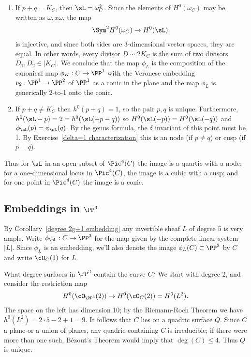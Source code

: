 \begin{enumerate}
\item If $p+q =  K_C$, then $\sL = \omega_C^2$. Since
the elements of $H^0(\omega_C)$ may be written as $\omega, x\omega$, the map
$$
\Sym^2 H^0(\omega_C) \to H^0(\sL).
$$
 is injective, and since both sides are 3-dimensional vector spaces, they are equal. In other words, every divisor $D \sim 2K_C$ is the sum of two divisors $D_1, D_2 \in |K_C|$. We conclude that the map $\phi_L$ is the composition of the canonical map $\phi_K : C \to \PP^1$ with the Veronese embedding $\nu_2 : \PP^1 \to \PP^2$ of $\PP^1$ as a conic in the plane and the map $\phi_L$ is generically 2-to-1 onto the conic.

\item \label{p+q not g12} If $p+q \neq  K_C$  then $h^0(p+q) = 1$, so the pair $p,q$ is unique. Furthermore,
 $h^0(\sL-p) = 2 =  h^0(\sL(-p-q))$ so 
 $H^0(\sL(-p)) = H^0(\sL(-q))$ and $\phi_\sL(p) = \phi_\sL(q)$. 
By the genus formula, the $\delta$ invariant of this point must be 1. By Exercise~\ref{delta=1 characterization}
 this is an node (if $p\neq q$) or cusp (if $p=q$).

\end{enumerate}

Thus  for $\sL$ in an open subset of $\Pic^4(C)$ the image is a quartic with a node; for a one-dimensional locus in $\Pic^4(C)$, the image is a cubic with a cusp; and for one point in $\Pic^4(C)$ the image is a conic.

\subsection{Embeddings in $\PP^3$}

By Corollary~\ref{degree 2g+1 embedding} any invertible sheaf $L$ of degree 5 is very ample. 
Write $\phi_\sL : C \to \PP^3$ for the map given by the complete linear system $|L|$. Since $\phi_L$ is an embedding, we'll also denote the image $\phi_L(C) \subset \PP^3$ by $C$ and write $\cO_C(1)$ for $L$.

What degree surfaces in $\PP^3$ contain the curve $C$? We start with degree 2, and consider the restriction map
$$
H^0(\cO_{\PP^3}(2)) \to H^0(\cO_C(2)) = H^0(L^2).
$$
The space on the left has dimension 10; by the Riemann-Roch Theorem we have $h^0(L^2) = 2\cdot5 - 2 + 1 = 9$. It follows that $C$ lies on a quadric surface $Q$. Since $C$ a plane or a union of planes, any quadric containing $C$ is irreducible; if there were more than one such, B\'ezout's Theorem would imply that $\deg(C) \leq 4$. Thus $Q$ is unique.

